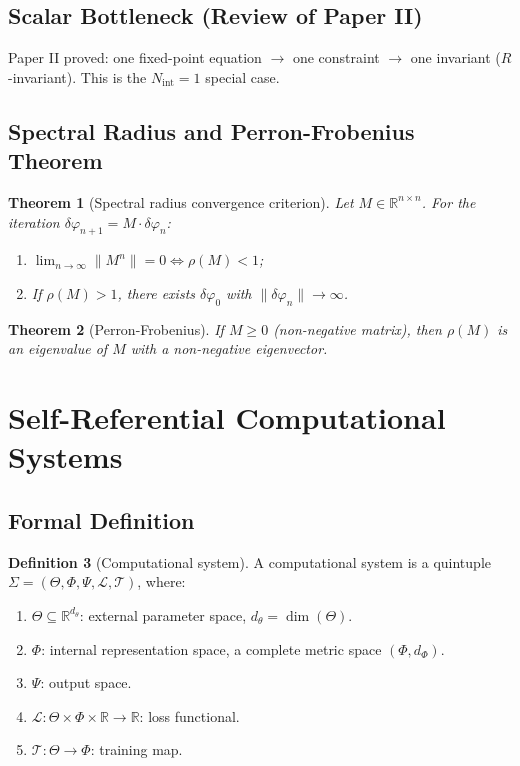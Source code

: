 \documentclass[12pt,a4paper]{article}
\newtheorem{theorem}{Theorem}[section]
\theoremstyle{definition}
\newtheorem{definition}[theorem]{Definition}
\newcommand{\mL}{\mathcal{L}}
\newcommand{\mT}{\mathcal{T}}
\newcommand{\mPhi}{\Phi}
\newcommand{\mPsi}{\Psi}
\newcommand{\mTheta}{\Theta}
\newcommand{\R}{\mathbb{R}}
\newcommand{\Nint}{N_{\mathrm{int}}}
\begin{document}
\subsection{Scalar Bottleneck (Review of Paper II)}

Paper II proved: one fixed-point equation $\to$ one constraint $\to$ one invariant ($R$-invariant). This is the $\Nint = 1$ special case.

\subsection{Spectral Radius and Perron-Frobenius Theorem}

\begin{theorem}[Spectral radius convergence criterion]
\label{thm:spectral}
Let $M \in \R^{n \times n}$. For the iteration $\delta\varphi_{n+1} = M \cdot \delta\varphi_n$:
\begin{enumerate}[label=(\alph*)]
\item $\lim_{n\to\infty} \|M^n\| = 0 \iff \rho(M) < 1$;
\item If $\rho(M) > 1$, there exists $\delta\varphi_0$ with $\|\delta\varphi_n\| \to \infty$.
\end{enumerate}
\end{theorem}

\begin{theorem}[Perron-Frobenius]
If $M \geq 0$ (non-negative matrix), then $\rho(M)$ is an eigenvalue of $M$ with a non-negative eigenvector.
\end{theorem}

\section{Self-Referential Computational Systems}
\label{sec:sr-system}

\subsection{Formal Definition}

\begin{definition}[Computational system]
\label{def:cs}
A computational system is a quintuple $\Sigma = (\mTheta, \mPhi, \mPsi, \mL, \mT)$, where:
\begin{enumerate}[label=(\roman*)]
\item $\mTheta \subseteq \R^{d_\theta}$: external parameter space, $d_\theta = \dim(\mTheta)$.
\item $\mPhi$: internal representation space, a complete metric space $(\mPhi, d_\mPhi)$.
\item $\mPsi$: output space.
\item $\mL: \mTheta \times \mPhi \times \R \to \R$: loss functional.
\item $\mT: \mTheta \to \mPhi$: training map.
\end{enumerate}
\end{definition}
\end{document}
